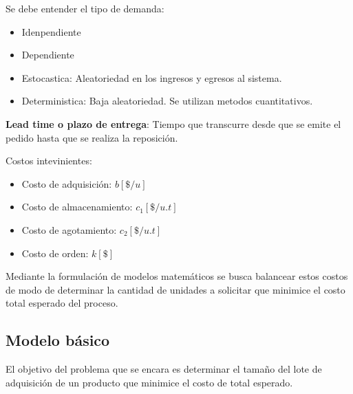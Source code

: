 \documentclass{article}
\begin{document}
Se debe entender el tipo de demanda:

\begin{itemize}
    \item Idenpendiente
    \item Dependiente
    \item Estocastica: Aleatoriedad en los ingresos y egresos al sistema.
    \item Deterministica: Baja aleatoriedad. Se utilizan metodos cuantitativos.
\end{itemize}

\textbf{Lead time o plazo de entrega}: Tiempo que transcurre desde que se emite el pedido hasta que se realiza la reposición.

Costos intevinientes:

\begin{itemize}
    \item Costo de adquisición: \(b[\$/u]\)
    \item Costo de almacenamiento: \(c_1[\$/u.t]\)
    \item Costo de agotamiento: \(c_2[\$/u.t]\)
    \item Costo de orden: \(k[\$]\)
\end{itemize}

Mediante la formulación de modelos matemáticos se busca balancear estos costos de modo 
de determinar la cantidad de unidades a solicitar que minimice el costo total esperado del proceso.

\subsection{Modelo básico}

El objetivo del problema que se encara es determinar el tamaño del lote de adquisición de un 
producto que minimice el costo de total esperado.
\end{document}

